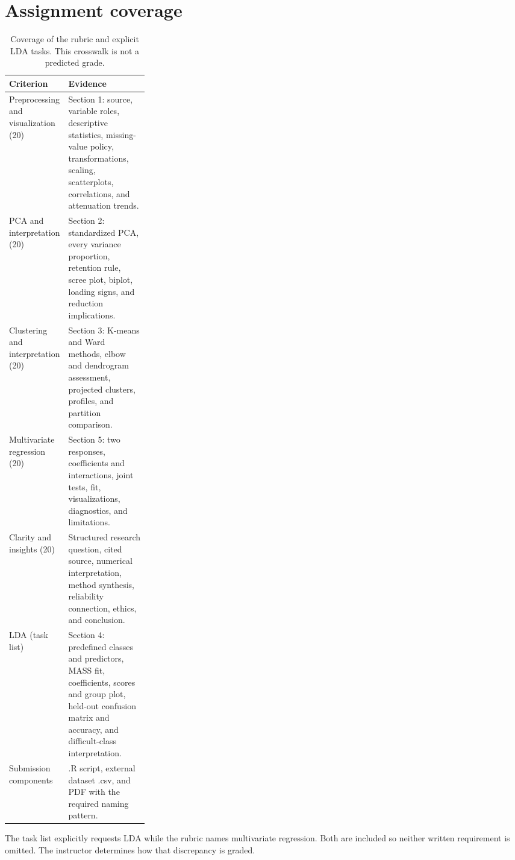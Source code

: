 \documentclass[11pt]{article}
\begin{document}
\section{Assignment coverage}
\begin{table}[!htbp]
\centering\small
\caption{Coverage of the rubric and explicit LDA tasks. This crosswalk is not a predicted grade.}
\begin{tabularx}{\linewidth}{@{}p{0.27\linewidth} X@{}}
\toprule
Criterion & Evidence \\
\midrule
Preprocessing and visualization (20) & Section 1: source, variable roles, descriptive statistics, missing-value policy, transformations, scaling, scatterplots, correlations, and attenuation trends. \\
PCA and interpretation (20) & Section 2: standardized PCA, every variance proportion, retention rule, scree plot, biplot, loading signs, and reduction implications. \\
Clustering and interpretation (20) & Section 3: K-means and Ward methods, elbow and dendrogram assessment, projected clusters, profiles, and partition comparison. \\
Multivariate regression (20) & Section 5: two responses, coefficients and interactions, joint tests, fit, visualizations, diagnostics, and limitations. \\
Clarity and insights (20) & Structured research question, cited source, numerical interpretation, method synthesis, reliability connection, ethics, and conclusion. \\
LDA (task list) & Section 4: predefined classes and predictors, MASS fit, coefficients, scores and group plot, held-out confusion matrix and accuracy, and difficult-class interpretation. \\
Submission components & .R script, external dataset .csv, and PDF with the required naming pattern. \\
\bottomrule
\end{tabularx}
\end{table}
The task list explicitly requests LDA while the rubric names multivariate regression. Both are included so neither written requirement is omitted. The instructor determines how that discrepancy is graded.
\end{document}
